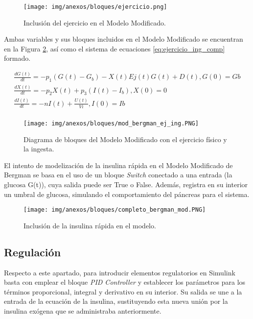 \begin{figure}[htbp]
    \centering
    \texttt{[image: img/anexos/bloques/ejercicio.png]}
    \caption{Inclusión del ejercicio en el Modelo Modificado.}
    \label{fig:diag_ejercicio}
\end{figure}
Ambas variables y sus bloques incluidos en el Modelo Modificado se encuentran en la Figura \ref{fig:diag_completo_modificado}, así como el sistema de ecuaciones \ref{eq:ejercicio_ing_comp} formado.
\clearpage

\begin{align} 
    \frac{dG(t)}{dt}= -p_1 (G(t) - G_b) - X(t)Ej(t)G(t)+D(t), G(0)=Gb \\
    \frac{dX(t)}{dt}= -p_2 X(t) + p_3(I(t) - I_b), X(0) = 0 \\
    \frac{dI(t)}{dt}= -n I(t) + \frac{U(t)}{Vi}, I(0) = Ib \\
    \label{eq:ejercicio_ing_comp}
\end{align}

\begin{figure}[htbp]
    \centering
    \texttt{[image: img/anexos/bloques/mod\_bergman\_ej\_ing.PNG]}
    \caption{Diagrama de bloques del Modelo Modificado con el ejercicio físico y la ingesta.}
    \label{fig:diag_completo_modificado}
\end{figure}

\clearpage
El intento de modelización de la insulina rápida en el Modelo Modificado de Bergman se basa en el uso de un bloque \textit{Switch} conectado a una entrada (la glucosa G(t)), cuya salida puede ser True o False. Además, registra en su interior un umbral de glucosa, simulando el comportamiento del páncreas para el sistema.

\begin{figure}[htbp]
    \centering
    \texttt{[image: img/anexos/bloques/completo\_bergman\_mod.PNG]}
    \caption{Inclusión de la insulina rápida en el modelo.}
    \label{fig:diag_ins_rapida}
\end{figure}
\clearpage
\subsection{Regulación}

Respecto a este apartado, para introducir elementos regulatorios en Simulink basta con emplear el bloque \textit{PID Controller} y establecer los parámetros para los términos proporcional, integral y derivativo en su interior. Su salida se une a la entrada de la ecuación de la insulina, sustituyendo esta nueva unión por la insulina exógena que se administraba anteriormente.

